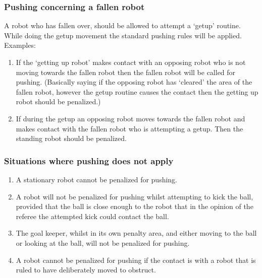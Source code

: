 \documentclass[12pt]{article}
\begin{document}
\subsubsection{Pushing concerning a fallen robot}

A robot who has fallen over, should be allowed to attempt a `getup'
routine. While doing the getup movement the standard pushing rules will be applied. Examples:

\begin{enumerate}

\item If the `getting up robot' makes contact with an opposing robot who is not moving towards the fallen robot then the fallen robot will be called for pushing. (Basically saying if the opposing robot has `cleared' the area of the fallen robot, however the getup routine causes the contact then the getting up robot should be penalized.)

\item If during the getup an opposing robot moves towards the fallen robot and makes contact with the fallen robot who is attempting a getup.
Then the standing robot should be penalized.

\end{enumerate}

\subsubsection{Situations where pushing does not apply}
\label{sec:not_pushing}

\begin{enumerate}

\item A stationary robot cannot be penalized for pushing.

\item A robot will not be penalized for pushing whilst attempting to kick the ball, provided that the ball is close enough to the robot that in the opinion of the referee the attempted kick could contact the ball.

\item The goal keeper, whilst in its own penalty area, and either moving to the ball or looking at the ball, will not be penalized for pushing.

\item A robot cannot be penalized for pushing if the contact is with a robot that is ruled to have deliberately moved to obstruct.

\end{enumerate}
\end{document}
